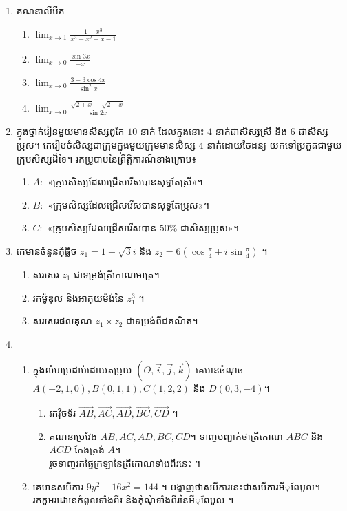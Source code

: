\documentclass{officialexam}
\begin{document}
\begin{enumerate}[I]
	\item គណនាលីមីត \begin{enumerate}[k,4]
		\item $\lim_{x\to1}\frac{1-x^3}{x^3-x^2+x-1}$
		\item $\lim_{x\to0}\frac{\sin3x}{-x}$ 
		\item $\lim_{x\to0}\frac{3-3\cos4x}{\sin^2x}$
		\item $\lim_{x\to0}\frac{\sqrt{2+x}-\sqrt{2-x}}{\sin 2x}$
	\end{enumerate}
	\item ក្នុងថ្នាក់រៀនមួយមានសិស្សពូកែ $10$ នាក់ ដែលក្នុងនោះ $4$ នាក់ជាសិស្សស្រី និង $6$ ជាសិស្សប្រុស។ គេរៀបចំសិស្សជាក្រុមក្នុងមួយក្រុមមានសិស្ស $4$ នាក់ដោយចៃដន្យ យកទៅប្រកួតជាមួយក្រុមសិស្សដ៏ទៃ។ រកប្រូបាបនៃព្រឹត្តិការណ៍ខាងក្រោម៖
		\begin{enumerate}[k]
			\item $A:$ «ក្រុមសិស្សដែលជ្រើសរើសបានសុទ្ធតែស្រី»។
			\item $B:$ «ក្រុមសិស្សដែលជ្រើសរើសបានសុទ្ធតែប្រុស»​។
			\item $C:$ «ក្រុមសិស្សដែលជ្រើសរើសបាន $50\%$ ជាសិស្សប្រុស»។
		\end{enumerate}
	\item គេមានចំនួនកុំផ្លិច $z_1=1+\sqrt{3}i$ និង $z_2=6\left(\cos\frac{\pi}{4}+i\sin\frac{\pi}{4}\right)$ ។
		\begin{enumerate}[k]
			\item សរសេរ $z_1$ ជាទម្រង់ត្រីកោណមាត្រ។
			\item រកម៉ូឌុល និងអាគុយម៉ង់នៃ $z_1^3$ ។
			\item សរសេរផលគុណ $z_1\times z_2$ ជាទម្រង់ពីជគណិត។
		\end{enumerate}
	\item 
	\begin{enumerate}[1]
		\item ក្នុងលំហប្រដាប់ដោយតម្រុយ $\left(O,\vec{i},\vec{j},\vec{k}\right)$ គេមានចំណុច $A(-2,1,0),B(0,1,1),C(1,2,2)$ និង $D(0,3,-4)$។
		\begin{enumerate}[k]
			\item រកវ៉ិចទ័រ $\overrightarrow{AB},\overrightarrow{AC},\overrightarrow{AD},\overrightarrow{BC},\overrightarrow{CD}$ ។
			\item គណនាប្រវែង $AB, AC, AD, BC, CD$។ ទាញបញ្ជាក់ថាត្រីកោណ $ABC$ និង $ACD$ កែងត្រង់ $A$។\\ រួចទាញរកផ្ទៃក្រឡានៃត្រីកោណទាំងពីរនេះ ។
		\end{enumerate}
		\item គេមានសមីការ $9y^2-16x^2=144$ ។ បង្ហាញថាសមីការនេះជាសមីការអីុពែបូល។ រកកូអរដោនេកំពូលទាំងពីរ និងកុំណុំទាំងពីរនៃអីុពែបូល ។

\end{enumerate}
\end{enumerate}
\end{document}
